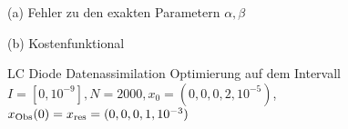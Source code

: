 % 
% 
% 
% 
\begin{figure}[H]
\footnotesize
\centering
\begin{minipage}[b]{0.49\linewidth}

\caption*{(a) Fehler zu den exakten Parametern $\alpha,\beta$}
\end{minipage}
\begin{minipage}[b]{0.49\linewidth}

\caption*{(b) Kostenfunktional\\$~~$}
\end{minipage}
\caption{LC Diode Datenassimilation Optimierung auf dem Intervall $I = [0,10^{-9}], N=2000,x_0=(0,0,0,2,10^{-5})$,$x_{\text{Obs}}(0) =x_{\text{res}}=(0,0,0,1,10^{-3})$}
\label{fig:lcOpt}
\end{figure}

